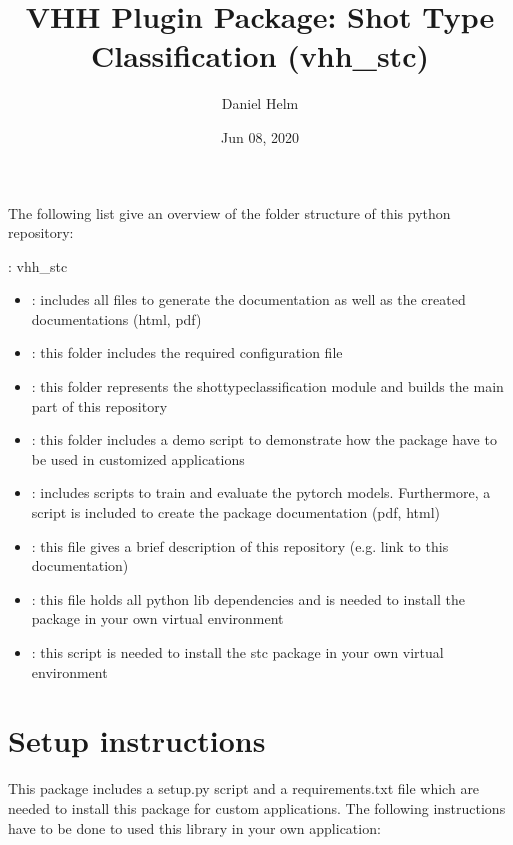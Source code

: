 \documentclass[letterpaper,10pt,english,openany,oneside]{sphinxmanual}
\title{VHH Plugin Package: Shot Type Classification (vhh\_stc)}
\date{Jun 08, 2020}
\author{Daniel Helm}
\begin{document}
\pagestyle{empty}
\sphinxmaketitle
\pagestyle{plain}
\sphinxtableofcontents
\pagestyle{normal}
\label{\detokenize{index::doc}}


The following list give an overview of the folder structure of this python repository:

: vhh\_stc
\begin{itemize}
\item {} 
: includes all files to generate the documentation as well as the created documentations (html, pdf)

\item {} 
: this folder includes the required configuration file

\item {} 
: this folder represents the shot\sphinxhyphen{}type\sphinxhyphen{}classification module and builds the main part of this repository

\item {} 
: this folder includes a demo script to demonstrate how the package have to be used in customized applications

\item {} 
: includes scripts to train and evaluate the pytorch models. Furthermore, a script is included to create the package documentation (pdf, html)

\item {} 
: this file gives a brief description of this repository (e.g. link to this documentation)

\item {} 
: this file holds all python lib dependencies and is needed to install the package in your own virtual environment

\item {} 
: this script is needed to install the stc package in your own virtual environment

\end{itemize}


\chapter{Setup  instructions}
\label{\detokenize{index:setup-instructions}}
This package includes a setup.py script and a requirements.txt file which are needed to install this package for custom applications.
The following instructions have to be done to used this library in your own application:
\end{document}
